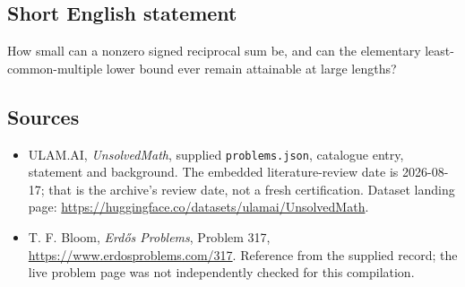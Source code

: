 \documentclass[11pt,a4paper]{article}
\begin{document}
\subsection{Short English statement}

How small can a nonzero signed reciprocal sum be, and can the elementary least-common-multiple lower bound ever remain attainable at large lengths?

\subsection{Sources}

{\small

\begin{itemize}

\item[\hypertarget{source:statement:1}{S1}] ULAM.AI, \emph{UnsolvedMath}, supplied \texttt{problems.json}, catalogue entry, statement and background. The embedded literature-review date is 2026-08-17; that is the archive’s review date, not a fresh certification. Dataset landing page: \url{https://huggingface.co/datasets/ulamai/UnsolvedMath}.

\item[\hypertarget{source:statement:2}{S2}] T. F. Bloom, \emph{Erdős Problems}, Problem 317, \url{https://www.erdosproblems.com/317}. Reference from the supplied record; the live problem page was not independently checked for this compilation.

\end{itemize}

}

\label{end:statement}
\end{document}
